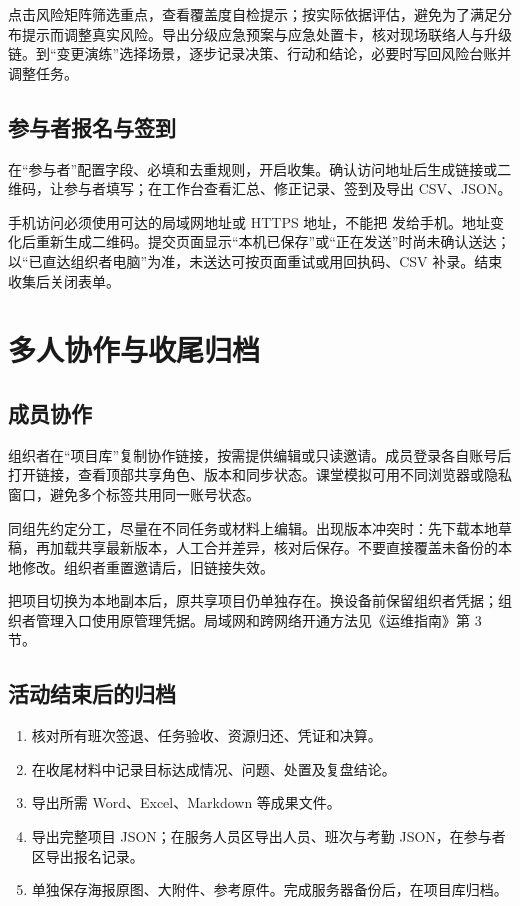 \documentclass[UTF8,fontset=windows,zihao=-4,a4paper]{ctexart}
\begin{document}
点击风险矩阵筛选重点，查看覆盖度自检提示；按实际依据评估，避免为了满足分布提示而调整真实风险。导出分级应急预案与应急处置卡，核对现场联络人与升级链。到“变更演练”选择场景，逐步记录决策、行动和结论，必要时写回风险台账并调整任务。


\subsection*{参与者报名与签到}

在“参与者”配置字段、必填和去重规则，开启收集。确认访问地址后生成链接或二维码，让参与者填写；在工作台查看汇总、修正记录、签到及导出 CSV、JSON。


手机访问必须使用可达的局域网地址或 HTTPS 地址，不能把  发给手机。地址变化后重新生成二维码。提交页面显示“本机已保存”或“正在发送”时尚未确认送达；以“已直达组织者电脑”为准，未送达可按页面重试或用回执码、CSV 补录。结束收集后关闭表单。


\section{多人协作与收尾归档}\label{sec:6}

\subsection*{成员协作}

组织者在“项目库”复制协作链接，按需提供编辑或只读邀请。成员登录各自账号后打开链接，查看顶部共享角色、版本和同步状态。课堂模拟可用不同浏览器或隐私窗口，避免多个标签共用同一账号状态。


同组先约定分工，尽量在不同任务或材料上编辑。出现版本冲突时：先下载本地草稿，再加载共享最新版本，人工合并差异，核对后保存。不要直接覆盖未备份的本地修改。组织者重置邀请后，旧链接失效。


把项目切换为本地副本后，原共享项目仍单独存在。换设备前保留组织者凭据；组织者管理入口使用原管理凭据。局域网和跨网络开通方法见《运维指南》第 3 节。


\subsection*{活动结束后的归档}

\begin{enumerate}[start=1]

\item 核对所有班次签退、任务验收、资源归还、凭证和决算。

\item 在收尾材料中记录目标达成情况、问题、处置及复盘结论。

\item 导出所需 Word、Excel、Markdown 等成果文件。

\item 导出完整项目 JSON；在服务人员区导出人员、班次与考勤 JSON，在参与者区导出报名记录。

\item 单独保存海报原图、大附件、参考原件。完成服务器备份后，在项目库归档。

\end{enumerate}
\end{document}
